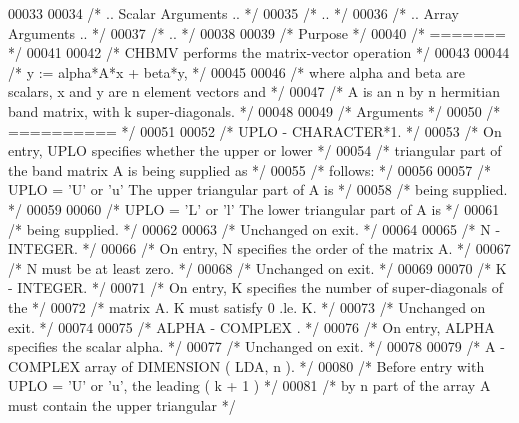 \begin{DoxyCode}
00033 
00034 \textcolor{comment}{/*     .. Scalar Arguments .. */}
00035 \textcolor{comment}{/*     .. */}
00036 \textcolor{comment}{/*     .. Array Arguments .. */}
00037 \textcolor{comment}{/*     .. */}
00038 
00039 \textcolor{comment}{/*  Purpose */}
00040 \textcolor{comment}{/*  ======= */}
00041 
00042 \textcolor{comment}{/*  CHBMV  performs the matrix-vector  operation */}
00043 
00044 \textcolor{comment}{/*     y := alpha*A*x + beta*y, */}
00045 
00046 \textcolor{comment}{/*  where alpha and beta are scalars, x and y are n element vectors and */}
00047 \textcolor{comment}{/*  A is an n by n hermitian band matrix, with k super-diagonals. */}
00048 
00049 \textcolor{comment}{/*  Arguments */}
00050 \textcolor{comment}{/*  ========== */}
00051 
00052 \textcolor{comment}{/*  UPLO   - CHARACTER*1. */}
00053 \textcolor{comment}{/*           On entry, UPLO specifies whether the upper or lower */}
00054 \textcolor{comment}{/*           triangular part of the band matrix A is being supplied as */}
00055 \textcolor{comment}{/*           follows: */}
00056 
00057 \textcolor{comment}{/*              UPLO = 'U' or 'u'   The upper triangular part of A is */}
00058 \textcolor{comment}{/*                                  being supplied. */}
00059 
00060 \textcolor{comment}{/*              UPLO = 'L' or 'l'   The lower triangular part of A is */}
00061 \textcolor{comment}{/*                                  being supplied. */}
00062 
00063 \textcolor{comment}{/*           Unchanged on exit. */}
00064 
00065 \textcolor{comment}{/*  N      - INTEGER. */}
00066 \textcolor{comment}{/*           On entry, N specifies the order of the matrix A. */}
00067 \textcolor{comment}{/*           N must be at least zero. */}
00068 \textcolor{comment}{/*           Unchanged on exit. */}
00069 
00070 \textcolor{comment}{/*  K      - INTEGER. */}
00071 \textcolor{comment}{/*           On entry, K specifies the number of super-diagonals of the */}
00072 \textcolor{comment}{/*           matrix A. K must satisfy  0 .le. K. */}
00073 \textcolor{comment}{/*           Unchanged on exit. */}
00074 
00075 \textcolor{comment}{/*  ALPHA  - COMPLEX         . */}
00076 \textcolor{comment}{/*           On entry, ALPHA specifies the scalar alpha. */}
00077 \textcolor{comment}{/*           Unchanged on exit. */}
00078 
00079 \textcolor{comment}{/*  A      - COMPLEX          array of DIMENSION ( LDA, n ). */}
00080 \textcolor{comment}{/*           Before entry with UPLO = 'U' or 'u', the leading ( k + 1 ) */}
00081 \textcolor{comment}{/*           by n part of the array A must contain the upper triangular */}

\end{DoxyCode}
